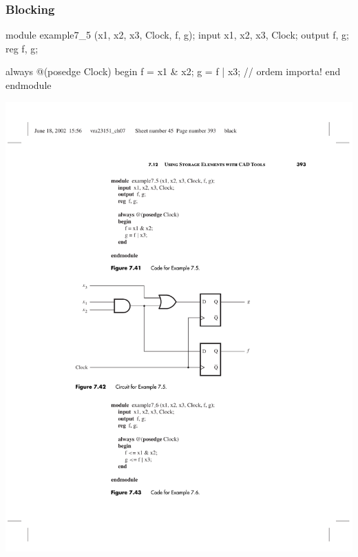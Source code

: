 \begin{frame}[fragile]
	\frametitle{Blocking}
	\begin{verilogcode}
module example7_5 (x1, x2, x3, Clock, f, g); 
  input x1, x2, x3, Clock;
  output f, g;
  reg f, g;

  always @(posedge Clock) 
  begin
    f = x1 & x2; 
    g = f | x3; // ordem importa!
  end
endmodule
    \end{verilogcode}
    \includegraphics[scale=.6]{figs/VerilogFig7_42}
\end{frame}


